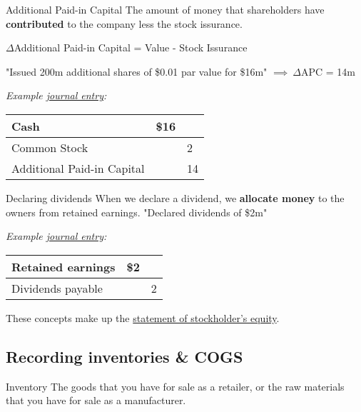 \begin{knBox}
    {Additional Paid-in Capital}
    The amount of money that shareholders have \textbf{contributed} to the company less the stock issurance.
    \begin{center}
        $\Delta$Additional Paid-in Capital = Value - Stock Issurance
    \end{center}
    \tcblower
    "Issued 200m additional shares of \$0.01 par value for \$16m" $\implies\ \Delta$APC = 14m

    \vspace{1em}
    \textit{Example \hyperref[subsec:prepare]{journal entry}:}
    \begin{tabular}{|l|l|l|}
        \hline
        Cash                             & \$16 &    \\
        \hline
        \quad Common Stock               &      & 2  \\
        \hline
        \quad Additional Paid-in Capital &      & 14 \\
        \hline
    \end{tabular}
    \label{def:apic}
\end{knBox}

\begin{knBox}
    {Declaring dividends}
    When we declare a dividend, we \textbf{allocate money} to the owners from retained earnings.
    \tcblower
    "Declared dividends of \$2m"

    \vspace{1em}
    \textit{Example \hyperref[subsec:prepare]{journal entry}:}
    \begin{tabular}{|l|l|l|}
        \hline
        Retained earnings       & \$2 &   \\
        \hline
        \quad Dividends payable &     & 2 \\
        \hline
    \end{tabular}
\end{knBox}

These concepts make up the \hyperref[sec:statement_se]{statement of stockholder's equity}.

\subsection{Recording inventories \& COGS}

\begin{definition}
    {Inventory}
    The goods that you have for sale as a retailer, or the raw materials that you have for sale as a manufacturer.
\end{definition}

